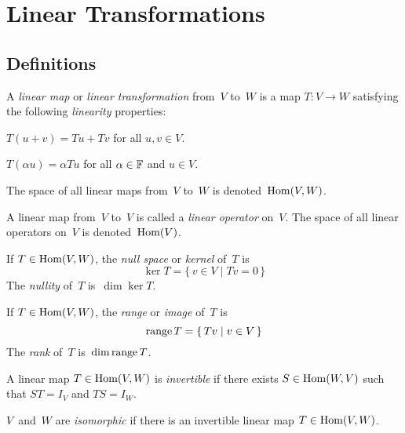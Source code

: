 %
%
%
\section{Linear Transformations}
\subsection*{Definitions}
\begin{defn}
A \emph{linear map} or \emph{linear transformation} from~\(V\) to~\(W\) is a map \(T:V\to W\) satisfying the following \emph{linearity} properties:
\begin{description}[itemsep=0pt]
\item[Additivity] \(T(u+v)=Tu+Tv\) for all \(u,v\in V\).
\item[Homogeneity] \(T(\alpha u)=\alpha Tu\) for all \(\alpha\in\mathbb{F}\) and \(u\in V\).
\end{description}
The space of all linear maps from~\(V\) to~\(W\) is denoted~\(\operatorname{Hom}(V,W)\).

A linear map from~\(V\) to~\(V\) is called a \emph{linear operator} on~\(V\). The space of all linear operators on~\(V\) is denoted~\(\operatorname{Hom}(V)\).
\end{defn}

\begin{defn}
If \(T\in\operatorname{Hom}(V,W)\), the \emph{null space} or \emph{kernel} of~\(T\) is
\[\ker T=\{\,v\in V\mid Tv=0\,\}\]
The \emph{nullity} of~\(T\) is~\(\dim\ker T\).
\end{defn}

\begin{defn}
If \(T\in\operatorname{Hom}(V,W)\), the \emph{range} or \emph{image} of~\(T\) is
\[\operatorname{range} T=\{\,Tv\mid v\in V\,\}\]
The \emph{rank} of~\(T\) is~\(\dim\operatorname{range} T\).
\end{defn}

\begin{defn}
A linear map \(T\in\operatorname{Hom}(V,W)\) is \emph{invertible} if there exists \(S\in\operatorname{Hom}(W,V)\) such that \(ST=I_V\) and \(TS=I_W\).
\end{defn}

\begin{defn}
\(V\)~and~\(W\) are \emph{isomorphic} if there is an invertible linear map \(T\in\operatorname{Hom}(V,W)\).
\end{defn}

